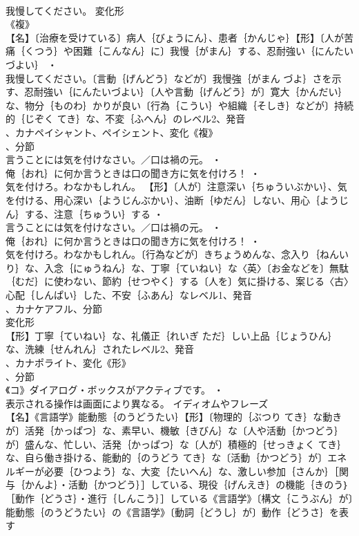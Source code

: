 \documentclass[8pt]{extreport}
\begin{document}
\begin{CJK}{UTF8}{min}
\\	我慢してください。	変化形 
\\	《複》
\\	【名】〔治療を受けている〕病人｛びょうにん｝、患者｛かんじゃ｝【形】〔人が苦痛｛くつう｝や困難｛こんなん｝に〕我慢｛がまん｝する、忍耐強い｛にんたいづよい｝ ・
\\	我慢してください。〔言動｛げんどう｝などが〕我慢強｛がまん づよ｝さを示す、忍耐強い｛にんたいづよい｝〔人や言動｛げんどう｝が〕寛大｛かんだい｝な、物分｛ものわ｝かりが良い〔行為｛こうい｝や組織｛そしき｝などが〕持続的｛じぞく てき｝な、不変｛ふへん｝のレベル2、発音
\\	、カナペイシャント、ペイシェント、変化《複》
\\	、分節
\\	言うことには気を付けなさい。／口は禍の元。 ・
\\	俺｛おれ｝に何か言うときは口の聞き方に気を付けろ！ ・
\\	気を付けろ。わなかもしれん。		【形】〔人が〕注意深い｛ちゅういぶかい｝、気を付ける、用心深い｛ようじんぶかい｝、油断｛ゆだん｝しない、用心｛ようじん｝する、注意｛ちゅうい｝する ・
\\	言うことには気を付けなさい。／口は禍の元。 ・
\\	俺｛おれ｝に何か言うときは口の聞き方に気を付けろ！ ・
\\	気を付けろ。わなかもしれん。〔行為などが〕きちょうめんな、念入り｛ねんいり｝な、入念｛にゅうねん｝な、丁寧｛ていねい｝な〈英〉〔お金などを〕無駄｛むだ｝に使わない、節約｛せつやく｝する〔人を〕気に掛ける、案じる〈古〉心配｛しんぱい｝した、不安｛ふあん｝なレベル1、発音
\\	、カナケアフル、分節
\\	変化形 
\\	【形】丁寧｛ていねい｝な、礼儀正｛れいぎ ただ｝しい上品｛じょうひん｝な、洗練｛せんれん｝されたレベル2、発音
\\	、カナポライト、変化《形》
\\	、分節
\\	《コ》ダイアログ・ボックスがアクティブです。 ・
\\	表示される操作は画面により異なる。	イディオムやフレーズ 
\\	【名】《言語学》能動態｛のうどうたい｝【形】〔物理的｛ぶつり てき｝な動きが〕活発｛かっぱつ｝な、素早い、機敏｛きびん｝な〔人や活動｛かつどう｝が〕盛んな、忙しい、活発｛かっぱつ｝な〔人が〕積極的｛せっきょく てき｝な、自ら働き掛ける、能動的｛のうどう てき｝な〔活動｛かつどう｝が〕エネルギーが必要｛ひつよう｝な、大変｛たいへん｝な、激しい参加｛さんか｝［関与｛かんよ｝・活動｛かつどう｝］している、現役｛げんえき｝の機能｛きのう｝［動作｛どうさ｝・進行｛しんこう｝］している《言語学》〔構文｛こうぶん｝が〕能動態｛のうどうたい｝の《言語学》〔動詞｛どうし｝が〕動作｛どうさ｝を表す

\end{CJK}
\end{document}
